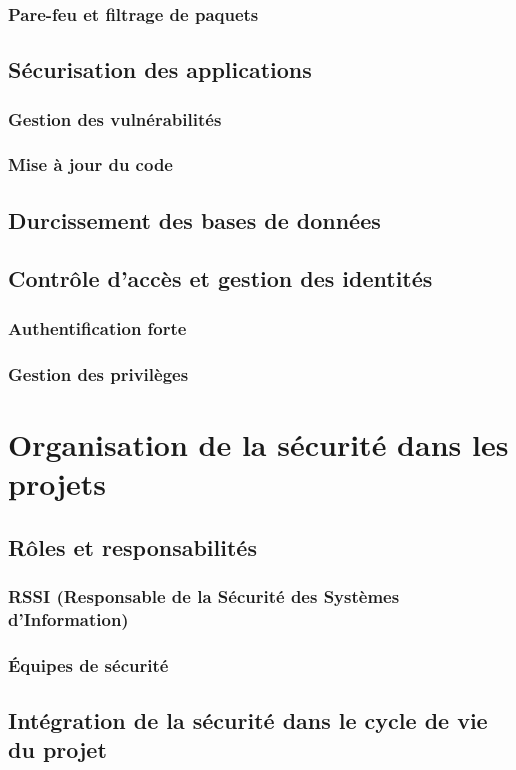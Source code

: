\subsubsection{Pare-feu et filtrage de paquets}
\subsection{Sécurisation des applications}
\subsubsection{Gestion des vulnérabilités}
\subsubsection{Mise à jour du code}
\subsection{Durcissement des bases de données}
\subsection{Contrôle d'accès et gestion des identités}
\subsubsection{Authentification forte}
\subsubsection{Gestion des privilèges}
\section{Organisation de la sécurité dans les projets}
\subsection{Rôles et responsabilités}
\subsubsection{RSSI (Responsable de la Sécurité des Systèmes d'Information)}
\subsubsection{Équipes de sécurité}
\subsection{Intégration de la sécurité dans le cycle de vie du projet}
